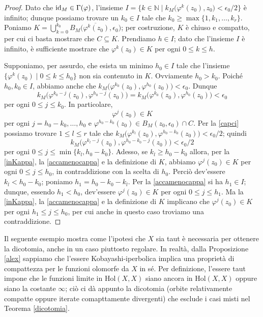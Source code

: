 \begin{proof}
    Dato che $\operatorname{id}_M\in\Gamma(\varphi)$, l'insieme $I=\{k\in\mathbb{N}\mid k_M\big(\varphi^k(z_0),z_0\big)<\epsilon_0/2\}$ è infinito; dunque possiamo trovare un $k_0 \in I$ tale che $k_0 \ge \max\{1,k_1,\dots,k_r\}$. Poniamo $\displaystyle K=\bigcup_{k=0}^{k_0}\overline{B_M\big(\varphi^k(z_0),\epsilon_0\big)}$; per costruzione, $K$ è chiuso e compatto, per cui ci basta mostrare che $C \subseteq K$. Prendiamo $h \in I$; dato che l'insieme $I$ è infinito, è sufficiente mostrare che $\varphi^k(z_0) \in K$ per ogni $0 \le k \le h$.

    Supponiamo, per assurdo, che esista un minimo $h_0 \in I$ tale che l'insieme $\{\varphi^k(z_0)\mid 0\le k\le h_0\}$ non sia contenuto in $K$. Ovviamente $h_0>k_0$. Poiché $h_0,k_0 \in I$, abbiamo anche che $k_M\big(\varphi^{k_0}(z_0),\varphi^{h_0}(z_0)\big)<\epsilon_0$. Dunque
    $$k_M\big(\varphi^{k_0-j}(z_0),\varphi^{h_0-j}(z_0)\big)=k_M\big(\varphi^{k_0}(z_0),\varphi^{h_0}(z_0)\big)<\epsilon_0$$
    per ogni $0 \le j \le k_0$. In particolare,
    \begin{equation} \label{inKappa}
        \varphi^j(z_0) \in K
    \end{equation}
    per ogni $j=h_0-k_0,\dots,h_0$ e $\varphi^{h_0-k_0}(z_0)\in B_M(z_0,\epsilon_0)\cap C$. Per la \eqref{capci} possiamo trovare $1 \le l \le r$ tale che $k_M\big(\varphi^{k_l}(z_0),\varphi^{h_0-k_0}(z_0)\big)<\epsilon_0/2$; quindi
    \begin{equation} \label{accamenocappa}
        k_M\big(\varphi^{k_l-j}(z_0),\varphi^{h_0-k_0-j}(z_0)\big)<\epsilon_0/2
    \end{equation}
    per ogni $0 \le j \le \min\{k_l,h_0-k_0\}$. Adesso, se $k_l \ge h_0-k_0$ allora, per la \eqref{inKappa}, la \eqref{accamenocappa} e la definizione di $K$, abbiamo $\varphi^j(z_0) \in K$ per ogni $0 \le j \le h_0$, in contraddizione con la scelta di $h_0$. Perciò dev'essere $k_l<h_0-k_0$; poniamo $h_1=h_0-k_0-k_l$. Per la \eqref{accamenocappa} si ha $h_1 \in I$; dunque, essendo $h_1<h_0$, dev'essere $\varphi^j(z_0) \in K$ per ogni $0 \le j \le h_1$. Ma la \eqref{inKappa}, la \eqref{accamenocappa} e la definizione di $K$ implicano che $\varphi^j(z_0) \in K$ per ogni $h_1 \le j \le h_0$, per cui anche in questo caso troviamo una contraddizione.
\end{proof}

Il seguente esempio mostra come l'ipotesi che $X$ sia taut è necessaria per ottenere la dicotomia, anche in un caso piuttosto regolare. In realtà, dalla Proposizione \ref{alex} sappiamo che l'essere Kobayashi-iperbolica implica una proprietà di compattezza per le funzioni olomorfe da $X$ in sé. Per definizione, l'essere taut impone che le funzioni limite in $\text{Hol}(X,X)$ siano ancora in $\text{Hol}(X,X)$ oppure siano la costante $\infty$; ciò ci dà appunto la dicotomia (orbite relativamente compatte oppure iterate comapttamente divergenti) che esclude i casi misti nel Teorema \ref{dicotomia}.

